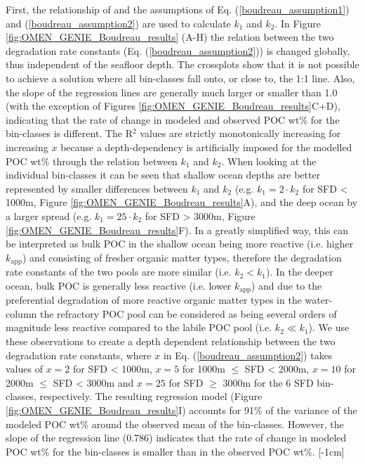 \documentclass[gmd, manuscript]{copernicus}
\begin{document}
First, the relationship of \citet{boudreau1997diagenetic} and the assumptions of Eq. (\ref{boudreau_assumption1}) and (\ref{boudreau_assumption2}) are used to calculate $k_1$ 
and $k_2$. In Figure \ref{fig:OMEN_GENIE_Boudreau_results} (A-H) the relation between the two degradation rate constants (Eq. (\ref{boudreau_assumption2})) is changed globally, thus independent of the seafloor depth. 
The crossplots show that it is not possible to achieve a solution where all bin-classes fall onto, or close to, the 1:1 line. Also, the slope of the regression lines are generally much larger or smaller than 1.0 
(with the exception of Figures \ref{fig:OMEN_GENIE_Boudreau_results}C+D), indicating that the rate of change in modeled and observed POC wt\% for the bin-classes is different. 
The R$^2$ values are strictly monotonically increasing for increasing $x$ because a depth-dependency is artificially imposed for the modelled POC wt\% through the relation between $k_1$ and $k_2$. 
When looking at the individual bin-classes it can be seen that shallow ocean depths are better represented by smaller differences between $k_1$ and $k_2$ (e.g. $k_1 = 2 \cdot k_2$ for SFD < 1000m, Figure \ref{fig:OMEN_GENIE_Boudreau_results}A),
and the deep ocean by a larger spread (e.g. $k_1 = 25 \cdot k_2$ for SFD > 3000m, Figure \ref{fig:OMEN_GENIE_Boudreau_results}F). 
In a greatly simplified way, this can be interpreted as bulk POC in the shallow ocean being more reactive (i.e. higher $k_\mathrm{app}$) and consisting of fresher organic matter types, therefore the degradation rate constants of the 
two pools are more similar (i.e. $k_2 < k_1$). In the deeper ocean, bulk POC is generally less reactive (i.e. lower $k_\mathrm{app}$) and due to the preferential degradation of more reactive organic matter types in the water-column 
\citep{wakeham_compositions_1997, lee_composition_2000} the refractory POC pool can be considered as being several orders of magnitude less reactive compared to the labile POC pool (i.e. $k_2 \ll k_1$). 
We use these observations to create a depth dependent relationship between the two degradation rate constants, where $x$ in Eq. (\ref{boudreau_assumption2}) takes values of $x=2$ for SFD < 1000m, $x=5$ for 1000m $\leq$ SFD < 2000m, 
$x=10$ for 2000m $\leq$ SFD < 3000m and $x=25$ for SFD $\geq$ 3000m for the 6 SFD bin-classes, respectively. 
The resulting regression model (Figure \ref{fig:OMEN_GENIE_Boudreau_results}I) accounts for 91\% of the variance of the modeled POC wt\% around the observed mean of the bin-classes. 
However, the slope of the regression line (0.786) indicates that the rate of change in modeled POC wt\% for the bin-classes is smaller than in the observed POC wt\%.
[-1cm]%
\end{document}
